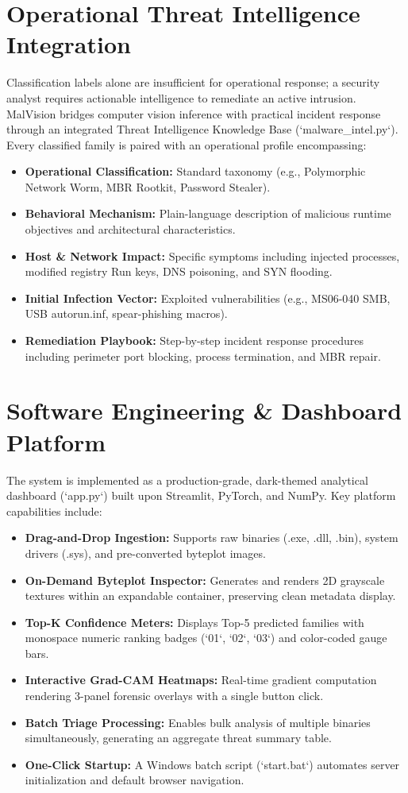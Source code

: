 \documentclass[journal,10pt,twocolumn]{IEEEtran}
\begin{document}
\section{Operational Threat Intelligence Integration}
Classification labels alone are insufficient for operational response; a security analyst requires actionable intelligence to remediate an active intrusion. MalVision bridges computer vision inference with practical incident response through an integrated Threat Intelligence Knowledge Base (`malware_intel.py`). Every classified family is paired with an operational profile encompassing:
\begin{itemize}
    \item \textbf{Operational Classification:} Standard taxonomy (e.g., Polymorphic Network Worm, MBR Rootkit, Password Stealer).
    \item \textbf{Behavioral Mechanism:} Plain-language description of malicious runtime objectives and architectural characteristics.
    \item \textbf{Host \& Network Impact:} Specific symptoms including injected processes, modified registry Run keys, DNS poisoning, and SYN flooding.
    \item \textbf{Initial Infection Vector:} Exploited vulnerabilities (e.g., MS06-040 SMB, USB autorun.inf, spear-phishing macros).
    \item \textbf{Remediation Playbook:} Step-by-step incident response procedures including perimeter port blocking, process termination, and MBR repair.
\end{itemize}

\section{Software Engineering \& Dashboard Platform}
The system is implemented as a production-grade, dark-themed analytical dashboard (`app.py`) built upon Streamlit, PyTorch, and NumPy. Key platform capabilities include:
\begin{itemize}
    \item \textbf{Drag-and-Drop Ingestion:} Supports raw binaries (.exe, .dll, .bin), system drivers (.sys), and pre-converted byteplot images.
    \item \textbf{On-Demand Byteplot Inspector:} Generates and renders 2D grayscale textures within an expandable container, preserving clean metadata display.
    \item \textbf{Top-K Confidence Meters:} Displays Top-5 predicted families with monospace numeric ranking badges (`01`, `02`, `03`) and color-coded gauge bars.
    \item \textbf{Interactive Grad-CAM Heatmaps:} Real-time gradient computation rendering 3-panel forensic overlays with a single button click.
    \item \textbf{Batch Triage Processing:} Enables bulk analysis of multiple binaries simultaneously, generating an aggregate threat summary table.
    \item \textbf{One-Click Startup:} A Windows batch script (`start.bat`) automates server initialization and default browser navigation.
\end{itemize}
\end{document}

